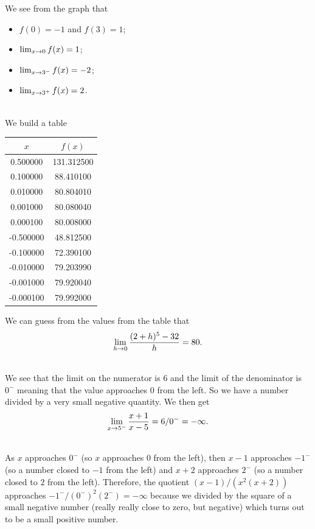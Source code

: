 	We see from the graph that
		\begin{itemize}
		\item $f(0) = -1$ and $f(3) = 1$;
		\item $\lim_{x \rightarrow 0} f(x) = 1$;
		\item $\lim_{x \rightarrow 3^-} f(x) = -2$;
		\item $\lim_{x \rightarrow 3^+} f(x) = 2$.
		\end{itemize}
	
	\spc

	\\
	We build a table
	\begin{center}
		\begin{tabular}{c|c}
		$x$ & $f(x)$ \\ \hline
0.500000 & 131.312500 \\  \hline
0.100000 & 88.410100 \\ \hline
0.010000 & 80.804010 \\ \hline
0.001000 & 80.080040 \\ \hline
0.000100 & 80.008000 \\ \hline
-0.500000 & 48.812500 \\ \hline
-0.100000 & 72.390100 \\ \hline
-0.010000 & 79.203990 \\ \hline
-0.001000 & 79.920040 \\ \hline
-0.000100 & 79.992000 \\ 
		\end{tabular}
	\end{center}
	
	We can guess from the values from the table that
		\begin{align*}
		\lim_{h \rightarrow 0} \frac{(2 + h)^5 - 32}{h} = 80 .
		\end{align*}
		
	\spc
	
	\\
	We see that the limit on the numerator is $6$ and the limit of the denominator is $0^-$ meaning that the value approaches $0$ from the left. So we have a number divided by a very small negative quantity. We then get
		\begin{align*}
		\lim_{x \rightarrow 5^-} \frac{x + 1}{x - 5} = 6 / 0^- = -\infty .
		\end{align*}
	
	\spc
	
	\\
	As $x$ approaches $0^-$ (so $x$ approaches $0$ from the left), then $x - 1$ approaches $-1^-$ (so a number closed to $-1$ from the left) and $x + 2$ approaches $2^-$ (so a number closed to $2$ from the left). Therefore, the quotient $(x - 1)/(x^2 (x + 2))$ approaches $-1^- / (0^-)^2 (2^-) = -\infty$ because we divided by the square of a small negative number (really really close to zero, but negative) which turns out to be a small positive number.
	
